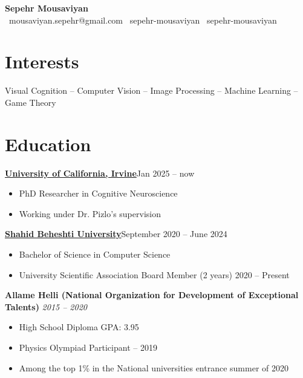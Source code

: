\documentclass[a4paper,10pt]{article}
\begin{document}
\pagestyle{empty}

\begin{center}
  \textbf{\LARGE Sepehr Mousaviyan} \\
  \vspace{0.2em}
  \small
  \faEnvelope~mousaviyan.sepehr@gmail.com \quad
  \faGithub~sepehr-mousaviyan \quad
  \faLinkedin~sepehr-mousaviyan
\end{center}

\section*{Interests}
Visual Cognition -- Computer Vision -- Image Processing -- Machine Learning   -- Game Theory

\section*{Education}

\textbf{\href{https://en.sbu.ac.ir/}{University of California, Irvine}}\hfill Jan 2025 -- now
\vspace{-0.5em}
\begin{itemize}
  \item PhD Researcher in Cognitive Neuroscience
  \item Working under Dr. Pizlo's supervision 
\end{itemize}

\textbf{\href{https://en.sbu.ac.ir/}{Shahid Beheshti University}}\hfill September 2020 -- June 2024
\vspace{-0.5em}
\begin{itemize}
  \item Bachelor of Science in Computer Science
  \item University Scientific Association Board Member (2 years) 2020 – Present
\end{itemize}

\textbf{Allame Helli (National Organization for Development of Exceptional Talents)} \hfill \textit{2015 -- 2020}
\begin{itemize}
  \item High School Diploma \quad GPA: 3.95
  \item Physics Olympiad Participant  -- 2019
  \item Among the top 1\% in the National universities entrance \quad summer of 2020
\end{itemize}

\end{document}
